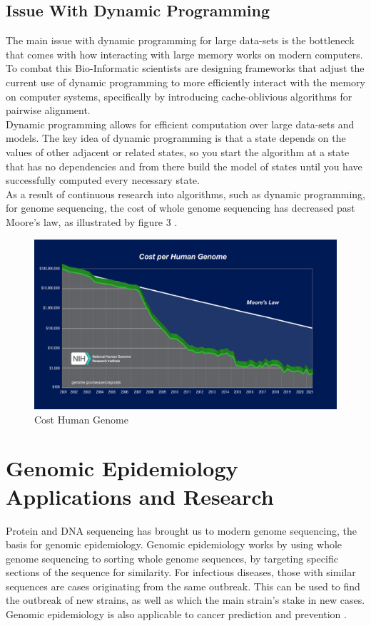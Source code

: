 \documentclass[12pt,journal,compsoc]{IEEEtran}
\begin{document}
\subsection{Issue With Dynamic Programming}
The main issue with dynamic programming for large data-sets is the bottleneck that comes with how interacting with large memory works on modern computers. To combat this Bio-Informatic scientists are designing frameworks that adjust the current use of dynamic programming to more efficiently interact with the memory on computer systems, specifically by introducing cache-oblivious algorithms for pairwise alignment. \cite{4609376} \\ 
Dynamic programming allows for efficient computation over large data-sets and models. The key idea of dynamic programming is that a state depends on the values of other adjacent or related states, so you start the algorithm at a state that has no dependencies and from there build the model of states until you have successfully computed every necessary state. \\ 
As a result of continuous research into algorithms, such as dynamic programming, for genome sequencing, the cost of whole genome sequencing has decreased past Moore's law, as illustrated by figure 3 \cite{genome.gov_2021}.
\begin{figure}[H]
    \centering
    \includegraphics[width=\linewidth]{images/2021_Sequencing_cost_per_Human_Genome.jpg}
    \caption{Cost Human Genome}
    \label{fig:Cost Human Genome}
\end{figure}

\section{Genomic Epidemiology Applications and Research}
Protein and DNA sequencing has brought us to modern genome sequencing, the basis for genomic epidemiology. Genomic epidemiology works by using whole genome sequencing to sorting whole genome sequences, by targeting specific sections of the sequence for similarity. For infectious diseases, those with similar sequences are cases originating from the same outbreak. This can be used to find the outbreak of new strains, as well as which the main strain's stake in new cases. Genomic epidemiology is also applicable to cancer prediction and prevention \cite{Kitano2013}.
\end{document}

